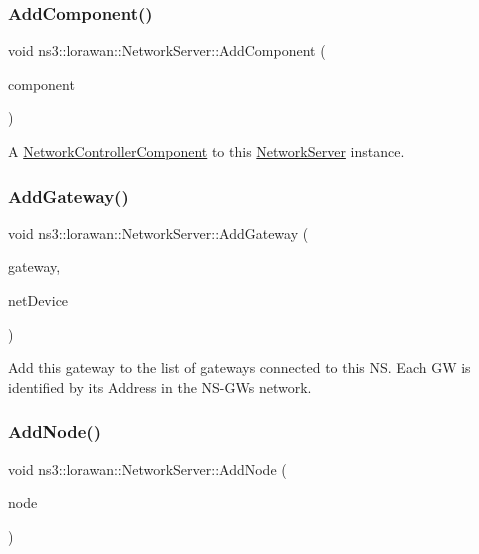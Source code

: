 \subsubsection{\texorpdfstring{Add\+Component()}{AddComponent()}}
{\footnotesize\ttfamily void ns3\+::lorawan\+::\+Network\+Server\+::\+Add\+Component (\begin{DoxyParamCaption}\item[{Ptr$<$ \hyperlink{classns3_1_1lorawan_1_1NetworkControllerComponent}{Network\+Controller\+Component} $>$}]{component }\end{DoxyParamCaption})}

A \hyperlink{classns3_1_1lorawan_1_1NetworkControllerComponent}{Network\+Controller\+Component} to this \hyperlink{classns3_1_1lorawan_1_1NetworkServer}{Network\+Server} instance. \mbox{\label{classns3_1_1lorawan_1_1NetworkServer_a7966b179bdd39dec7ed22a77442ce418}} 
\subsubsection{\texorpdfstring{Add\+Gateway()}{AddGateway()}}
{\footnotesize\ttfamily void ns3\+::lorawan\+::\+Network\+Server\+::\+Add\+Gateway (\begin{DoxyParamCaption}\item[{Ptr$<$ Node $>$}]{gateway,  }\item[{Ptr$<$ \hyperlink{classNetDevice}{Net\+Device} $>$}]{net\+Device }\end{DoxyParamCaption})}

Add this gateway to the list of gateways connected to this NS. Each GW is identified by its Address in the N\+S-\/\+G\+Ws network. \mbox{\label{classns3_1_1lorawan_1_1NetworkServer_a3e39ba499b1ae2e66efac0d278fe0c0c}} 
\subsubsection{\texorpdfstring{Add\+Node()}{AddNode()}}
{\footnotesize\ttfamily void ns3\+::lorawan\+::\+Network\+Server\+::\+Add\+Node (\begin{DoxyParamCaption}\item[{Ptr$<$ Node $>$}]{node }\end{DoxyParamCaption})}

